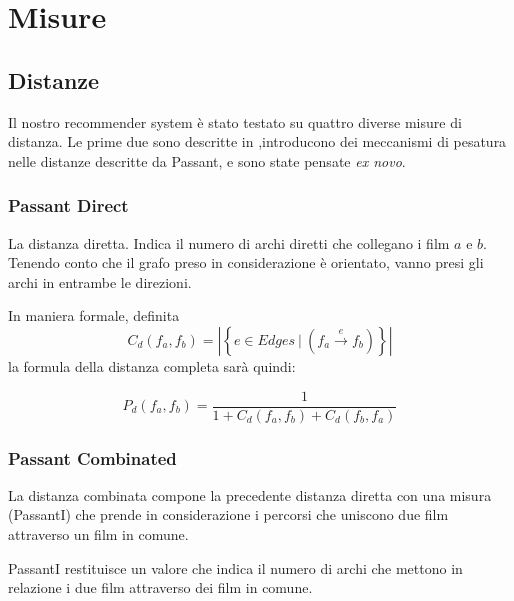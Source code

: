 \section{Misure}
\label{measures}

\subsection{Distanze}

Il nostro recommender system è stato testato su quattro diverse misure di distanza.
Le prime due sono descritte in \citet{passant2010measuring},introducono dei meccanismi di pesatura nelle distanze descritte da Passant, e sono state pensate \emph{ex novo}.


\subsubsection{Passant Direct}
\label{PassantD}
La distanza diretta. Indica il numero di archi diretti che collegano i film $a$ e $b$. Tenendo conto che il grafo preso in considerazione è orientato, vanno presi gli archi in entrambe le direzioni.

In maniera formale, definita $$C_{d}(f_a,f_b) = \left\vert \left\{ e \in Edges \  | \  (f_a \xrightarrow{~e~} f_b ) \right\} \right\vert$$ la formula della distanza completa sarà quindi:


    \begin{equation}
        P_{d}(f_{a},f_{b}) = \frac{1} {1+C_{d}(f_{a},f_{b})+C_{d}(f_{b},f_{a})}
    \end{equation}

\subsubsection{Passant Combinated}
\label{PassantC}

La distanza combinata compone la precedente distanza diretta con una misura
(PassantI) che prende in considerazione i percorsi che uniscono due film
attraverso un film in comune.

PassantI restituisce un valore che indica il numero di archi che
mettono in relazione i due film attraverso dei film in comune.

